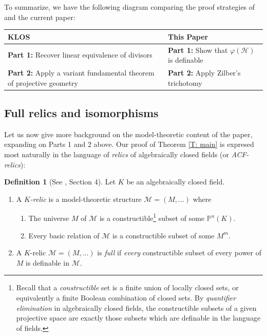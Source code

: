 \documentclass{amsart}
\theoremstyle{definition}
\newtheorem{definition}[theorem]{Definition}
\begin{document}
To summarize, we have the following diagram comparing the proof strategies of \cite{KLOS} and the current paper:

\begin{table}[h]
\centering
\renewcommand{\arraystretch}{1.3}
\begin{tabular}{|p{}|p{}|}
\hline
\textbf{KLOS} & \textbf{This Paper} \\
\hline
\textbf{Part 1:} Recover linear equivalence of divisors
&
\textbf{Part 1:} Show that $\varphi(\mathcal H)$ is definable
\\
\hline
\textbf{Part 2:} Apply a variant fundamental theorem of projective geometry
&
\textbf{Part 2:} Apply Zilber's trichotomy
\\
\hline
\end{tabular}
\end{table}


\subsection{Full relics and isomorphisms}

Let us now give more background on the model-theoretic content of the paper, expanding on Parts 1 and 2 above. Our proof of Theorem \ref{T: main} is expresed most naturally in the language of \textit{relics} of algebraically closed fields (or \textit{ACF-relics}):

\begin{definition}[See \cite{CasHasVA}, Section 4]\label{D: relic}
    Let $K$ be an algebraically closed field.
    \begin{enumerate}
        \item A \textit{$K$-relic} is a model-theoretic structure $\mathcal M=(M,...)$ where
        \begin{enumerate}
            \item The universe $M$ of $\mathcal M$ is a constructible\footnote{Recall that a \textit{constructible} set is a finite union of locally closed sets, or equivalently a finite Boolean combination of closed sets. By \textit{quantifier elimination} in algebraically closed fields, the constructible subsets of a given projective space are exactly those subsets which are definable in the language of fields.} subset of some $\mathbb P^n(K)$.
            \item Every basic relation of $\mathcal M$ is a constructible subset of some $M^m$.
        \end{enumerate}
        \item A $K$-relic $\mathcal M=(M,...)$ is \textit{full} if \textit{every} constructible subset of every power of $M$ is definable in $\mathcal M$.
    \end{enumerate}
\end{definition}
\end{document}
